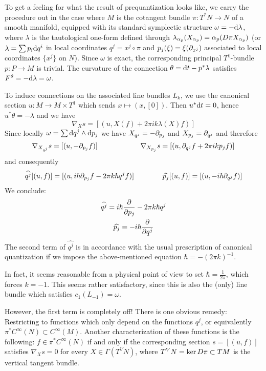 \documentclass[parskip=half]{scrartcl}
\begin{document}
\begin{ex}
	To get a feeling for what the result of prequantization looks like, we carry the procedure out in the case where $M$ is the cotangent bundle $\pi:T^*N\to N$ of a smooth manifold, equipped with its standard symplectic structure $\omega=-\mathrm{d} \lambda$, where $\lambda$ is the tautological one-form defined through $\lambda_{\alpha_p}(X_{\alpha_p})=\alpha_p(D\pi X_{\alpha_p})$ (or $\lambda =\sum p_i \mathrm{d} q^i$ in local coordinates $q^j=x^j\circ \pi$ and $p_j(\xi)=\xi(\partial_{x^j})$ associated to local coordinates $\{x^j\}$ on $N$). Since $\omega$ is exact, the corresponding principal $T^1$-bundle $p:P\to M$ is trivial. The curvature of the connection $\theta=\mathrm{d} t-p^*\lambda$ satisfies $F^\theta=-\mathrm{d} \lambda=\omega$. 
	
	To induce connections on the associated line bundles $L_k$, we use the canonical section $u:M\to M\times T^1$ which sends $x\mapsto (x,[0])$. Then $u^*\mathrm{d} t=0$, hence $u^*\theta=-\lambda$ and we have
	\begin{equation*}
		\nabla_X s = [(u,X(f)+2\pi i k \lambda (X)f)]
	\end{equation*}
	Since locally $\omega=\sum \mathrm{d} q^j \wedge \mathrm{d} p_j$ we have $X_{q^j}=-\partial_{p_j}$ and $X_{p_j}=\partial_{q^j}$ and therefore
	\begin{equation*}
		\nabla_{X_{q^j}}s=[(u,-\partial_{p_j}f)] \qquad \qquad \qquad 
		\nabla_{X_{p_j}}s=[(u,\partial_{q^j}f+2\pi i k p_jf)]
	\end{equation*}
	and consequently
	\begin{equation*}
		\widehat{q^j}[(u,f)]=[(u,i\hbar \partial_{p_j}f-2\pi k \hbar q^jf)]\qquad \qquad 
		\widehat{p_j}[(u,f)]=[(u,-i\hbar \partial_{q^j}f)]
	\end{equation*}
	We conclude:
	\begin{gather*}
		\widehat{q^j}=i\hbar\frac{\partial }{\partial p_j} -2\pi k \hbar q^j\\
		\widehat{p_j}=-i\hbar \frac{\partial }{\partial q^j}
	\end{gather*}
	The second term of $\widehat{q^j}$ is in accordance with the usual prescription of canonical quantization if we impose the above-mentioned equation $\hbar =-(2\pi k)^{-1}$.
	
	\begin{rem}
		In fact, it seems reasonable from a physical point of view to set $\hbar =\frac{1}{2\pi}$, which forces $k=-1$. This seems rather satisfactory, since this is also the (only) line bundle which satisfies $c_1(L_{-1})=\omega$.
	\end{rem}
	
	However, the first term is completely off! There is one obvious remedy: Restricting to functions which only depend on the functions $q^j$, or equivalently $\pi^*C^\infty(N)\subset C^\infty(M)$. Another characterization of these functions is the following: $f\in \pi^*C^\infty(N)$ if and only if the corresponding section $s=[(u,f)]$ satisfies $\nabla_X s=0$ for every $X\in \Gamma(T^VN)$, where $T^VN=\ker D \pi\subset TM$ is the vertical tangent bundle.
\end{ex}
\end{document}
